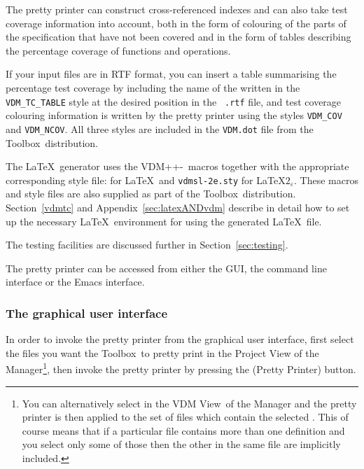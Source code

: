 \documentclass[\pformat,12pt]{article}
\newcommand{\Toolbox}{Toolbox}
\DeclareRobustCommand{\VdmSlPp}{VDM++-\VdmSl}
\newcommand{\vdmModView}{\guicmd{VDM View}}
\newcommand{\guicmd}[1]{{\sf #1}}
\begin{document}
The pretty printer can construct cross-referenced indexes and can also
take test coverage information into account, both in the form of
colouring of the parts of the specification that have not been covered
and in the form of tables describing the percentage coverage of
functions and operations.

If your input files are in  RTF format, you can insert a table
summarising the percentage test coverage by including the name of the
 written in the
\texttt{VDM\_TC\_TABLE} style at the desired position in the {\tt
  .rtf} file, and test coverage colouring information is written by the
pretty printer using the styles \texttt{VDM\_COV} and
\texttt{VDM\_NCOV}. All three styles are included in the {\tt VDM.dot} 
file from the \Toolbox\ distribution.

The \LaTeX\ generator uses the \VdmSlPp\ macros together with the
appropriate corresponding style file:
 for \LaTeX\ and 
{\tt vdmsl-2e.sty} for \LaTeX$2_{\varepsilon}$. These macros and style
files are also supplied as part of the \Toolbox\
distribution. Section~\ref{vdmtc} and Appendix~\ref{sec:latexANDvdm}
describe in detail how to set up the necessary \LaTeX\ environment for
using the generated \LaTeX\ file.

The testing facilities are discussed further in
Section~\ref{sec:testing}.

The pretty printer can be accessed from either the GUI, the
command line interface or the Emacs interface.


\subsubsection{The graphical user interface}

In order to invoke the pretty printer from the graphical user
interface, first select the files you want the \Toolbox\ to pretty
print in the \guicmd{Project View} of the
\guicmd{Manager}\footnote{You can alternatively select
   in the 
  \vdmModView\ of the \guicmd{Manager} and the pretty printer is
  then applied to the set of files which contain the selected
  . This of course means
  that if a particular file contains 
  more than one  definition and you
  select only some of those 
  then the other \ifthenelse{\boolean{VDMsl}}{modules}{classes} in the
  same file are implicitly included.}, then 
invoke the pretty printer by  pressing the  
(\guicmd{Pretty Printer}) button.
\end{document}
